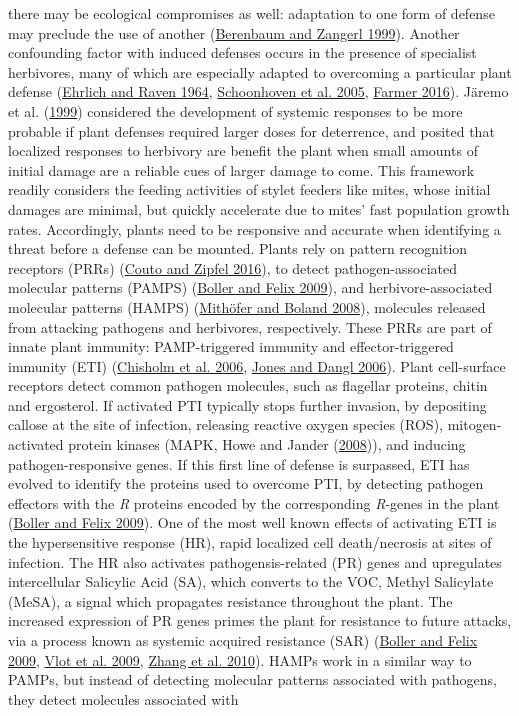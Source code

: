 \documentclass{ufdissertation}[overrideChapters] %
\begin{document}
{there may be ecological compromises as well: adaptation to one form of defense may preclude the use of another (\protect\hyperlink{ref-Berenbaum1999}{Berenbaum and Zangerl 1999}). Another confounding factor with induced defenses occurs in the presence of specialist herbivores, many of which are especially adapted to overcoming a particular plant defense (\protect\hyperlink{ref-Ehrlich1964}{Ehrlich and Raven 1964}, \protect\hyperlink{ref-Schoonhoven2005}{Schoonhoven et al. 2005}, \protect\hyperlink{ref-Farmer2016}{Farmer 2016}). Järemo et al. (\protect\hyperlink{ref-Jaeremo1999}{1999}) considered the development of systemic responses to be more probable if plant defenses required larger doses for deterrence, and posited that localized responses to herbivory are benefit the plant when small amounts of initial damage are a reliable cues of larger damage to come. This framework readily considers the feeding activities of stylet feeders like mites, whose initial damages are minimal, but quickly accelerate due to mites' fast population growth rates. Accordingly, plants need to be responsive and accurate when identifying a threat before a defense can be mounted. Plants rely on pattern recognition receptors (PRRs) (\protect\hyperlink{ref-Couto2016}{Couto and Zipfel 2016}), to detect pathogen-associated molecular patterns (PAMPS) (\protect\hyperlink{ref-Boller2009}{Boller and Felix 2009}), and herbivore-associated molecular patterns (HAMPS) (\protect\hyperlink{ref-Mithoefer2008}{Mithöfer and Boland 2008}), molecules released from attacking pathogens and herbivores, respectively. These PRRs are part of innate plant immunity: PAMP-triggered immunity and effector-triggered immunity (ETI) (\protect\hyperlink{ref-Chisholm2006}{Chisholm et al. 2006}, \protect\hyperlink{ref-Jones2006}{Jones and Dangl 2006}). Plant cell-surface receptors detect common pathogen molecules, such as flagellar proteins, chitin and ergosterol. If activated PTI typically stops further invasion, by depositing callose at the site of infection, releasing reactive oxygen species (ROS), mitogen-activated protein kinases (MAPK, Howe and Jander (\protect\hyperlink{ref-Howe2008}{2008})), and inducing pathogen-responsive genes. If this first line of defense is surpassed, ETI has evolved to identify the proteins used to overcome PTI, by detecting pathogen effectors with the \emph{R} proteins encoded by the corresponding \emph{R}-genes in the plant (\protect\hyperlink{ref-Boller2009}{Boller and Felix 2009}). One of the most well known effects of activating ETI is the hypersensitive response (HR), rapid localized cell death/necrosis at sites of infection. The HR also activates pathogensis-related (PR) genes and upregulates intercellular Salicylic Acid (SA), which converts to the VOC, Methyl Salicylate (MeSA), a signal which propagates resistance throughout the plant. The increased expression of PR genes primes the plant for resistance to future attacks, via a process known as systemic acquired resistance (SAR) (\protect\hyperlink{ref-Boller2009}{Boller and Felix 2009}, \protect\hyperlink{ref-Vlot2009}{Vlot et al. 2009}, \protect\hyperlink{ref-Zhang2010}{Zhang et al. 2010}). HAMPs work in a similar way to PAMPs, but instead of detecting molecular patterns associated with pathogens, they detect molecules associated with }
\end{document}
